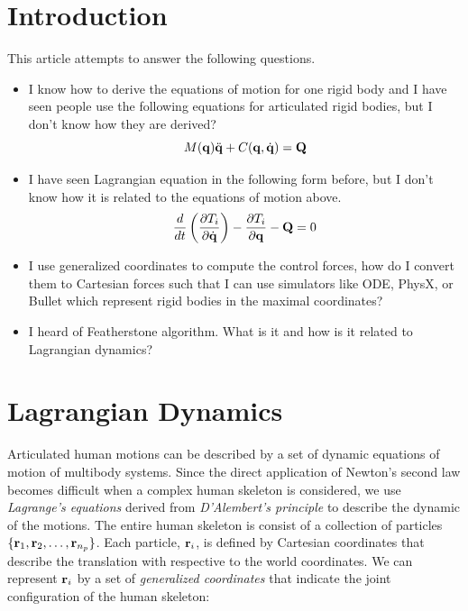 \section{Introduction}

This article attempts to answer the following questions.

\begin{itemize}
\item I know how to derive the equations of motion for one rigid body
  and I have seen people use the following equations for articulated
  rigid bodies, but I don't know how they are derived?
\begin{equation}
M(\mathbf{q}) \ddot{\mathbf{q}} + C(\mathbf{q}, \dot{\mathbf{q}})  = \mathbf{Q} \nonumber
\end{equation}

\item I have seen Lagrangian equation in the following form before, but I
  don't know how it is related to the equations of motion above.
\begin{equation}\label{eq:lagrangian_dyn}
    \frac{d}{dt} \left( \frac{\partial T_i}{\partial
    \dot{\mathbf{q}}} \right) - \frac{\partial T_i}{\partial
    \mathbf{q}} - \mathbf{Q} = 0 \nonumber
\end{equation}

\item I use generalized coordinates to compute the control forces, how do I convert them to Cartesian forces such that I can use simulators like ODE, PhysX, or Bullet which represent rigid bodies in the maximal coordinates?
\item I heard of Featherstone algorithm. What is it and how is it related to Lagrangian dynamics?
\end{itemize}

\section{Lagrangian Dynamics}
\label{sec:lagrangian}
Articulated human motions can be described by a set of dynamic
equations of motion of multibody systems. Since the direct
application of Newton's second law becomes difficult when a
complex human skeleton is considered, we use \emph{Lagrange's
equations} derived from \emph{D'Alembert's principle} to describe
the dynamic of the motions. The entire human skeleton is consist
of a collection of particles $\{\mathbf{r}_1, \mathbf{r}_2,
\ldots, \mathbf{r}_{n_p}\}$.  Each particle,
$\mathbf{r}_i$, is defined by Cartesian coordinates that
describe the translation with respective to the world coordinates.
We can represent $\mathbf{r}_i$ by a set of \emph{generalized
coordinates} that indicate the joint configuration of the human
skeleton:

